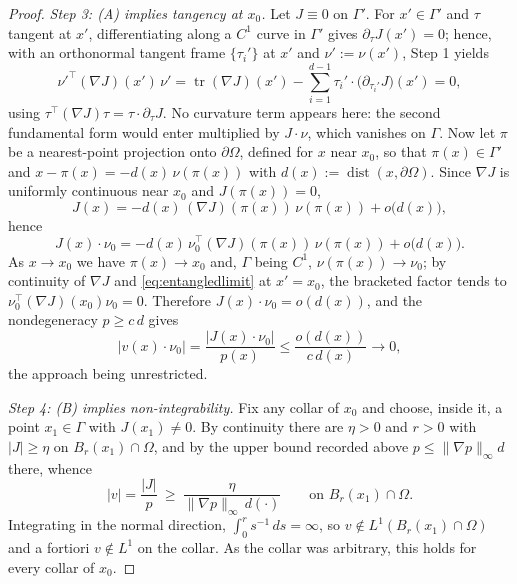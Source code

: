 \documentclass[10pt,a4paper]{amsart}
\newcommand{\dd}{\,d}
\begin{document}
\begin{proof}
\emph{Step 3: \textup{(A)} implies tangency at $x_0$.} Let $J\equiv0$
on $\Gamma'$. For $x'\in\Gamma'$ and $\tau$ tangent at $x'$,
differentiating along a $C^1$ curve in $\Gamma'$ gives
$\partial_\tau J(x')=0$; hence, with an orthonormal tangent frame
$\{\tau_i'\}$ at $x'$ and $\nu':=\nu(x')$, Step 1 yields
\begin{equation}\label{eq:entangledlimit}
\nu'^{\top}(\nabla J)(x')\,\nu'
=\operatorname{tr}(\nabla J)(x')-\sum_{i=1}^{d-1}
\tau_i'\cdot\big(\partial_{\tau_i'}J\big)(x')=0 ,
\end{equation}
using $\tau^{\top}(\nabla J)\tau=\tau\cdot\partial_\tau J$. No
curvature term appears here: the second fundamental form would enter
multiplied by $J\cdot\nu$, which vanishes on $\Gamma$. Now let $\pi$
be a nearest-point projection onto $\partial\Omega$, defined for $x$
near $x_0$, so that $\pi(x)\in\Gamma'$ and
$x-\pi(x)=-d(x)\,\nu(\pi(x))$ with
$d(x):=\operatorname{dist}(x,\partial\Omega)$. Since $\nabla J$ is
uniformly continuous near $x_0$ and $J(\pi(x))=0$,
\[
J(x)=-d(x)\,(\nabla J)(\pi(x))\,\nu(\pi(x))+o\big(d(x)\big),
\]
hence
\[
J(x)\cdot\nu_0=-d(x)\,\nu_0^{\top}(\nabla J)(\pi(x))\,\nu(\pi(x))
+o\big(d(x)\big).
\]
As $x\to x_0$ we have $\pi(x)\to x_0$ and, $\Gamma$ being $C^1$,
$\nu(\pi(x))\to\nu_0$; by continuity of $\nabla J$ and
\eqref{eq:entangledlimit} at $x'=x_0$, the bracketed factor tends to
$\nu_0^{\top}(\nabla J)(x_0)\nu_0=0$. Therefore $J(x)\cdot\nu_0
=o(d(x))$, and the nondegeneracy $p\ge c\,d$ gives
\[
\big|v(x)\cdot\nu_0\big|=\frac{|J(x)\cdot\nu_0|}{p(x)}
\le\frac{o(d(x))}{c\,d(x)}\longrightarrow0 ,
\]
the approach being unrestricted.

\emph{Step 4: \textup{(B)} implies non-integrability.} Fix any collar
of $x_0$ and choose, inside it, a point $x_1\in\Gamma$ with
$J(x_1)\neq0$. By continuity there are $\eta>0$ and $r>0$ with
$|J|\ge\eta$ on $B_r(x_1)\cap\Omega$, and by the upper bound
recorded above $p\le\|\nabla p\|_\infty d$ there, whence
\[
|v|=\frac{|J|}{p}\ \ge\ \frac{\eta}{\|\nabla p\|_\infty\,d(\cdot)}
\qquad\text{on }B_r(x_1)\cap\Omega .
\]
Integrating in the normal direction, $\int_0^r s^{-1}\dd s=\infty$,
so $v\notin L^1(B_r(x_1)\cap\Omega)$ and a fortiori $v\notin L^1$ on
the collar. As the collar was arbitrary, this holds for every collar
of $x_0$.

\end{proof}
\end{document}
